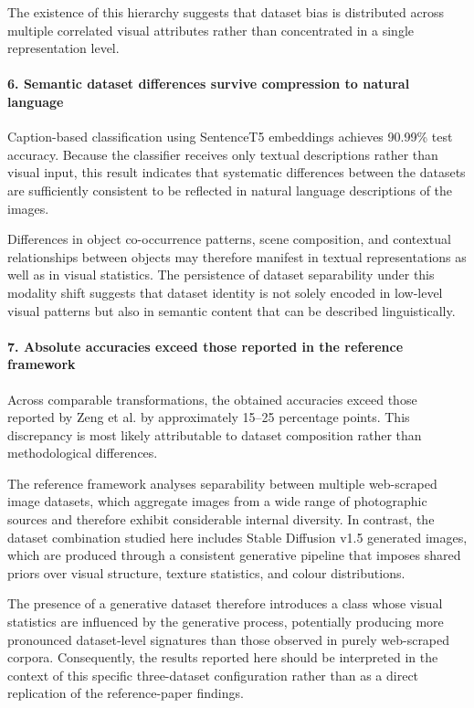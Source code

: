 The existence of this hierarchy suggests that dataset bias is distributed across multiple correlated visual attributes rather than concentrated in a single representation level.

\paragraph{6. Semantic dataset differences survive compression to natural language}

Caption-based classification using SentenceT5 embeddings achieves 90.99\% test accuracy. Because the classifier receives only textual descriptions rather than visual input, this result indicates that systematic differences between the datasets are sufficiently consistent to be reflected in natural language descriptions of the images.

Differences in object co-occurrence patterns, scene composition, and contextual relationships between objects may therefore manifest in textual representations as well as in visual statistics. The persistence of dataset separability under this modality shift suggests that dataset identity is not solely encoded in low-level visual patterns but also in semantic content that can be described linguistically.

\paragraph{7. Absolute accuracies exceed those reported in the reference framework}

Across comparable transformations, the obtained accuracies exceed those reported by Zeng et al. by approximately 15–25 percentage points. This discrepancy is most likely attributable to dataset composition rather than methodological differences.

The reference framework analyses separability between multiple web-scraped image datasets, which aggregate images from a wide range of photographic sources and therefore exhibit considerable internal diversity. In contrast, the dataset combination studied here includes Stable Diffusion v1.5 generated images, which are produced through a consistent generative pipeline that imposes shared priors over visual structure, texture statistics, and colour distributions.

The presence of a generative dataset therefore introduces a class whose visual statistics are influenced by the generative process, potentially producing more pronounced dataset-level signatures than those observed in purely web-scraped corpora. Consequently, the results reported here should be interpreted in the context of this specific three-dataset configuration rather than as a direct replication of the reference-paper findings.

